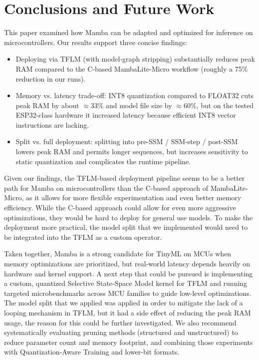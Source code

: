 \section{Conclusions and Future Work}
\label{sec:conclusion}

This paper examined how Mamba can be adapted and optimized for inference on microcontrollers. Our results support three concise findings:

\begin{itemize}
  \item Deploying via TFLM (with model-graph stripping) substantially reduces peak RAM compared to the C-based MambaLite-Micro workflow (roughly a 75\% reduction in our runs).
  \item Memory vs. latency trade-off: INT8 quantization compared to FLOAT32 cuts peak RAM by about $\approx33\%$ and model file size by $\approx60\%$, but on the tested ESP32-class hardware it increased latency because efficient INT8 vector instructions are lacking.
  \item Split vs. full deployment: splitting into pre-SSM / SSM-step / post-SSM lowers peak RAM and permits longer sequences, but increases sensitivity to static quantization and complicates the runtime pipeline.
\end{itemize}

Given our findings, the TFLM-based deployment pipeline seems to be a better path for Mamba on microcontrollers than the C-based approach of MambaLite-Micro, as it allows for more flexible experimentation and even better memory efficiency. While the C-based approach could allow for even more aggressive optimizations, they would be hard to deploy for general use models. To make the deployment more practical, the model split that we implemented would need to be integrated into the TFLM as a custom operator.

Taken together, Mamba is a strong candidate for TinyML on MCUs when memory optimizations are prioritized, but real-world latency depends heavily on hardware and kernel support. A next step that could be pursued is implementing a custom, quantized Selective State-Space Model kernel for TFLM and running targeted microbenchmarks across MCU families to guide low-level optimizations. The model split that we applied was applied in order to mitigate the lack of a looping mechanism in TFLM, but it had a side effect of reducing the peak RAM usage, the reason for this could be further investigated.
We also recommend systematically evaluating pruning methods (structured and unstructured) to reduce parameter count and memory footprint, and combining those experiments with Quantization-Aware Training and lower-bit formats.
